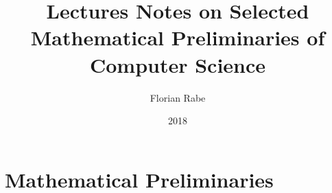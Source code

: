 \documentclass{book}
\title{Lectures Notes on Selected Mathematical Preliminaries of Computer Science}
\author{Florian Rabe}
\date{2018}
\begin{document}
\maketitle

\tableofcontents
\newpage

\chapter{Mathematical Preliminaries}


%
%
\end{document}
